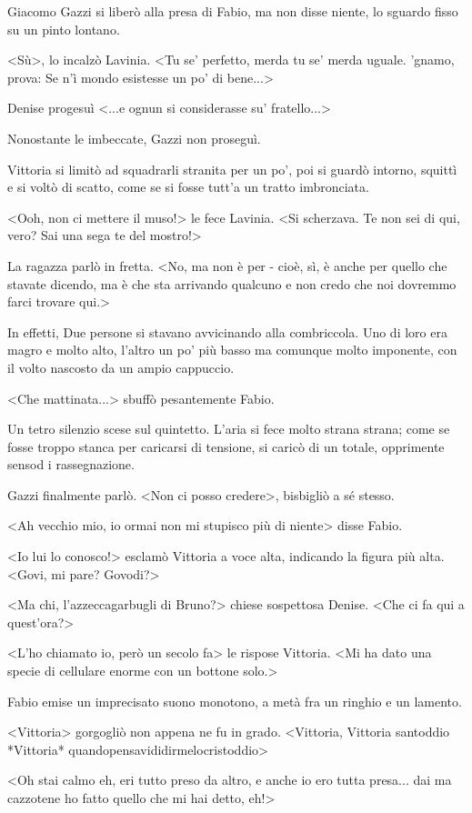 Giacomo Gazzi si liberò alla presa di Fabio, ma non disse niente, lo sguardo fisso su un pinto lontano. 

<Sù>, lo incalzò Lavinia. <Tu se' perfetto, merda tu se' merda uguale. 'gnamo, prova: Se n'ì mondo esistesse un po' di bene...>

Denise progesuì <...e ognun si considerasse su' fratello...>

Nonostante le imbeccate, Gazzi non proseguì.

Vittoria si limitò ad squadrarli stranita per un po', poi si guardò intorno, squittì e si voltò di scatto, come se si fosse tutt'a un tratto imbronciata.

<Ooh, non ci mettere il muso!> le fece Lavinia. <Si scherzava. Te non sei di qui, vero? Sai una sega te del mostro!>

La ragazza parlò in fretta. <No, ma non è per - cioè, sì, è anche per quello che stavate dicendo, ma è che sta arrivando qualcuno e non credo che noi dovremmo farci trovare qui.> 

In effetti, Due persone si stavano avvicinando alla combriccola. Uno di loro era magro e molto alto, l'altro un po' più basso ma comunque molto imponente, con il volto nascosto da un ampio cappuccio.

<Che mattinata...> sbuffò pesantemente Fabio.

Un tetro silenzio scese sul quintetto. L'aria si fece molto strana strana; come se fosse troppo stanca per caricarsi di tensione, si caricò di un totale, opprimente sensod i rassegnazione.

Gazzi finalmente parlò. <Non ci posso credere>, bisbigliò a sé stesso.

<Ah vecchio mio, io ormai non mi stupisco più di niente> disse Fabio.

<Io lui lo conosco!> esclamò Vittoria a voce alta, indicando la figura più alta. <Govi, mi pare? Govodi?>

<Ma chi, l'azzeccagarbugli di Bruno?> chiese sospettosa Denise. <Che ci fa qui a quest'ora?>

<L'ho chiamato io, però un secolo fa> le rispose Vittoria. <Mi ha dato una specie di cellulare enorme con un bottone solo.>

Fabio emise un imprecisato suono monotono, a metà fra un ringhio e un lamento.

<Vittoria> gorgogliò non appena ne fu in grado. <Vittoria, Vittoria santoddio *Vittoria* quandopensavididirmelocristoddio>

<Oh stai calmo eh, eri tutto preso da altro, e anche io ero tutta presa... dai ma cazzotene ho fatto quello che mi hai detto, eh!>

